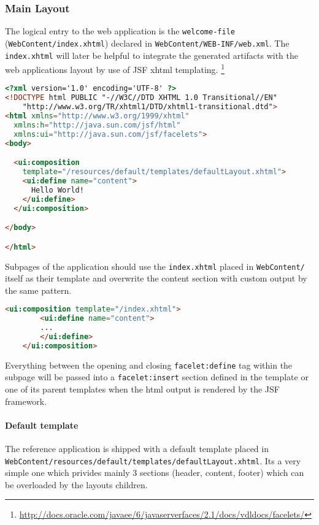 \subsubsection{Main Layout}
\label{subsec:referenceMainLayout} 

The logical entry to the web application is the \texttt{welcome-file}
(\texttt{WebContent/index.xhtml}) declared in
\texttt{WebContent/WEB-INF/web.xml}. The \texttt{index.xhtml} will later be
helpful to integrate the generated artifacts with the web applications layout by
use of JSF xhtml templating.
\footnote{\url{http://docs.oracle.com/javaee/6/javaserverfaces/2.1/docs/vdldocs/facelets/}}

\begin{lstlisting}[language=HTML]
<?xml version='1.0' encoding='UTF-8' ?>
<!DOCTYPE html PUBLIC "-//W3C//DTD XHTML 1.0 Transitional//EN" 
    "http://www.w3.org/TR/xhtml1/DTD/xhtml1-transitional.dtd">
<html xmlns="http://www.w3.org/1999/xhtml"
  xmlns:h="http://java.sun.com/jsf/html"
  xmlns:ui="http://java.sun.com/jsf/facelets">
<body>

  <ui:composition
    template="/resources/default/templates/defaultLayout.xhtml">
    <ui:define name="content">
      Hello World!
    </ui:define>
  </ui:composition>

</body>

</html>
\end{lstlisting}
 
Subpages of the application should use the \texttt{index.xhtml} placed in
\texttt{WebContent/} itself as their template and overwrite the content section
with custom output by the same pattern.

\begin{lstlisting}[language=HTML] 
	<ui:composition template="/index.xhtml">
  		<ui:define name="content">
  		...
  		</ui:define>
 	</ui:composition>
\end{lstlisting}

Everything between the opening and closing \texttt{facelet:define} tag within
the subpage will be passed into a \texttt{facelet:insert} section defined in the
template or one of its parent templates when the html output is rendered by the
JSF framework.

\paragraph{Default template}
$\;$ \\The reference application is shipped with a default template placed in
\newline \texttt{WebContent/resources/default/templates/defaultLayout.xhtml}. Its a very
simple one which privides mainly 3 sections (header, content, footer) which can
be overloaded by the layouts children.

